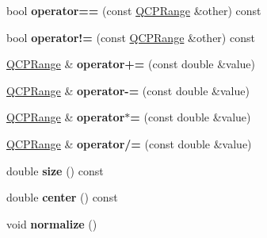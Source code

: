 \begin{DoxyCompactItemize}
\item 
bool {\bfseries operator==} (const \hyperlink{class_q_c_p_range}{Q\+C\+P\+Range} \&other) const \hypertarget{class_q_c_p_range_aa20f91509687505e25bd2ef10d2f0e15}{}\label{class_q_c_p_range_aa20f91509687505e25bd2ef10d2f0e15}

\item 
bool {\bfseries operator!=} (const \hyperlink{class_q_c_p_range}{Q\+C\+P\+Range} \&other) const \hypertarget{class_q_c_p_range_a9b9016ee83dea60573abb9a5ef4cdbcb}{}\label{class_q_c_p_range_a9b9016ee83dea60573abb9a5ef4cdbcb}

\item 
\hyperlink{class_q_c_p_range}{Q\+C\+P\+Range} \& {\bfseries operator+=} (const double \&value)\hypertarget{class_q_c_p_range_ad5dc7b236241944a3886b6017fb1b0c8}{}\label{class_q_c_p_range_ad5dc7b236241944a3886b6017fb1b0c8}

\item 
\hyperlink{class_q_c_p_range}{Q\+C\+P\+Range} \& {\bfseries operator-\/=} (const double \&value)\hypertarget{class_q_c_p_range_a279a67cbd92d2336a39be0cfdd1d3144}{}\label{class_q_c_p_range_a279a67cbd92d2336a39be0cfdd1d3144}

\item 
\hyperlink{class_q_c_p_range}{Q\+C\+P\+Range} \& {\bfseries operator$\ast$=} (const double \&value)\hypertarget{class_q_c_p_range_a1eda96ee1c350db3fb502f8a52836664}{}\label{class_q_c_p_range_a1eda96ee1c350db3fb502f8a52836664}

\item 
\hyperlink{class_q_c_p_range}{Q\+C\+P\+Range} \& {\bfseries operator/=} (const double \&value)\hypertarget{class_q_c_p_range_a80e0e1ea39325b7f98dbec27526f2dd3}{}\label{class_q_c_p_range_a80e0e1ea39325b7f98dbec27526f2dd3}

\item 
double {\bfseries size} () const \hypertarget{class_q_c_p_range_afa57c13049b965edb6fd1c00ac56338a}{}\label{class_q_c_p_range_afa57c13049b965edb6fd1c00ac56338a}

\item 
double {\bfseries center} () const \hypertarget{class_q_c_p_range_a3825b53cf17da5de0843c1f3baad07db}{}\label{class_q_c_p_range_a3825b53cf17da5de0843c1f3baad07db}

\item 
void {\bfseries normalize} ()\hypertarget{class_q_c_p_range_af914a7740269b0604d0827c634a878a9}{}\label{class_q_c_p_range_af914a7740269b0604d0827c634a878a9}


\end{DoxyCompactItemize}
